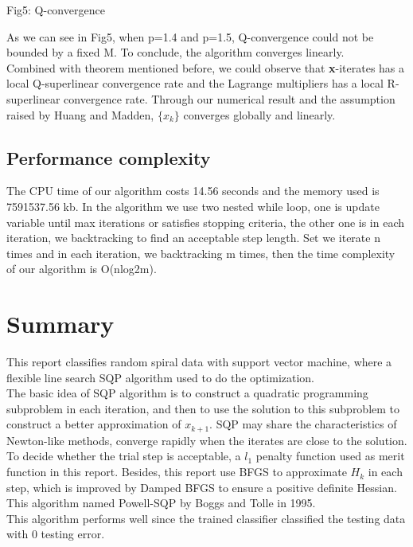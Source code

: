 \documentclass{article}
\begin{document}
\begin{spacing}{1.5}
\begin{center}
Fig5: Q-convergence 
\end{center}
As we can see in Fig5, when p=1.4 and p=1.5, Q-convergence could not be bounded by a fixed M. To conclude, the algorithm converges linearly.\\

Combined with theorem mentioned before, we could observe that \textbf{x}-iterates has a local Q-superlinear convergence rate and the Lagrange multipliers has a local R-superlinear convergence rate. Through our numerical result and the assumption raised by Huang and Madden, $\{x_k\}$ converges globally and linearly.

\subsection{Performance complexity}
The CPU time of our algorithm costs 14.56 seconds and the memory used is 7591537.56 kb. In the algorithm we use two nested while loop, one is update variable until max iterations or satisfies stopping criteria, the other one is in each iteration, we backtracking to find an acceptable step length. Set we iterate n times and in each iteration, we backtracking m times, then the time complexity of our algorithm is O(nlog2m).

\section{Summary}
This report classifies random spiral data  with support vector machine, where a flexible line search SQP algorithm used to do the optimization.\\


The basic idea of SQP algorithm is to construct a quadratic programming subproblem in each iteration, and then to use the solution to this subproblem to construct a better approximation of $x_{k+1}$. SQP may share the characteristics of Newton-like methods, converge rapidly when the iterates are close to the solution. To decide whether the trial step is acceptable, a $l_1$ penalty function used as merit function in this report. Besides, this report use BFGS to approximate $H_k$ in each step, which is improved by Damped BFGS to ensure a positive definite Hessian. This algorithm named Powell-SQP by Boggs and Tolle in 1995.\\

This algorithm performs well since the trained classifier classified the testing data with 0 testing error.

\newpage

\end{spacing}
\end{document}
